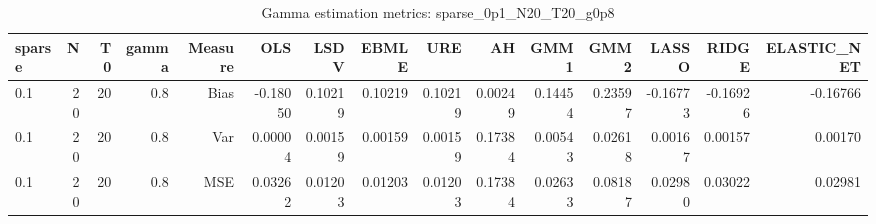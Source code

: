 \begin{table}[!htbp]\centering
\caption{Gamma estimation metrics: sparse_0p1_N20_T20_g0p8}
\label{tab:table1_sparse_0p1_N20_T20_g0p8}
\begin{tabular}{lrrrrrrrrrrrrrr}
\hline
sparse & N & T0 & gamma & Measure & OLS & LSDV & EBMLE & URE & AH & GMM1 & GMM2 & LASSO & RIDGE & ELASTIC_NET \\
\hline
0.1 & 20 & 20 & 0.8 & Bias & -0.18050 & 0.10219 & 0.10219 & 0.10219 & 0.00249 & 0.14454 & 0.23597 & -0.16773 & -0.16926 & -0.16766 \\
0.1 & 20 & 20 & 0.8 & Var & 0.00004 & 0.00159 & 0.00159 & 0.00159 & 0.17384 & 0.00543 & 0.02618 & 0.00167 & 0.00157 & 0.00170 \\
0.1 & 20 & 20 & 0.8 & MSE & 0.03262 & 0.01203 & 0.01203 & 0.01203 & 0.17384 & 0.02633 & 0.08187 & 0.02980 & 0.03022 & 0.02981 \\
\hline
\end{tabular}
\end{table}

